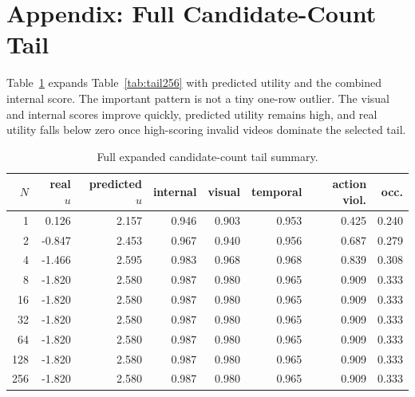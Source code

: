 \documentclass{article}
\begin{document}
\section{Appendix: Full Candidate-Count Tail}
\label{app:full-tail}

Table~\ref{tab:tail-full-expanded} expands Table~\ref{tab:tail256} with predicted utility and the combined internal score. The important pattern is not a tiny one-row outlier. The visual and internal scores improve quickly, predicted utility remains high, and real utility falls below zero once high-scoring invalid videos dominate the selected tail.

\begin{table}[tbp]
  \centering
  \small
  \caption{Full expanded candidate-count tail summary.}
  \label{tab:tail-full-expanded}
  \begin{tabular}{@{}rrrrrrrr@{}}
    \toprule
    \(N\) & real \(u\) & predicted \(u\) & internal & visual & temporal & action viol. & occ. \\
    \midrule
    1 & 0.126 & 2.157 & 0.946 & 0.903 & 0.953 & 0.425 & 0.240 \\
    2 & -0.847 & 2.453 & 0.967 & 0.940 & 0.956 & 0.687 & 0.279 \\
    4 & -1.466 & 2.595 & 0.983 & 0.968 & 0.968 & 0.839 & 0.308 \\
    8 & -1.820 & 2.580 & 0.987 & 0.980 & 0.965 & 0.909 & 0.333 \\
    16 & -1.820 & 2.580 & 0.987 & 0.980 & 0.965 & 0.909 & 0.333 \\
    32 & -1.820 & 2.580 & 0.987 & 0.980 & 0.965 & 0.909 & 0.333 \\
    64 & -1.820 & 2.580 & 0.987 & 0.980 & 0.965 & 0.909 & 0.333 \\
    128 & -1.820 & 2.580 & 0.987 & 0.980 & 0.965 & 0.909 & 0.333 \\
    256 & -1.820 & 2.580 & 0.987 & 0.980 & 0.965 & 0.909 & 0.333 \\
    \bottomrule
  \end{tabular}
\end{table}
\end{document}
